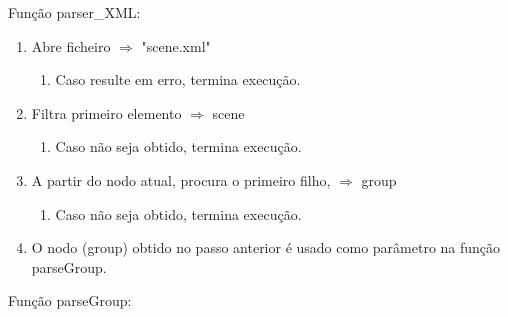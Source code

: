 \documentclass[a4paper]{article}
\begin{document}
  Função parser\_XML:

    \vspace{0.1cm}

\ttfamily
\begin{enumerate}
 \item Abre ficheiro $\Rightarrow$ "scene.xml"
    \begin{enumerate}
      \item Caso resulte em erro, termina execução.
    \end{enumerate}
 \item Filtra primeiro elemento $\Rightarrow$ scene
    \begin{enumerate}
      \item Caso não seja obtido, termina execução.
    \end{enumerate}
 \item A partir do nodo atual, procura o primeiro filho, $\Rightarrow$ group
    \begin{enumerate}
      \item Caso não seja obtido, termina execução.
    \end{enumerate}
 \item O nodo (group) obtido no passo anterior é usado como parâmetro na função parseGroup.
\end{enumerate}

  \vspace{0.3cm}

 Função parseGroup:

  \vspace{0.3cm}
\end{document}
